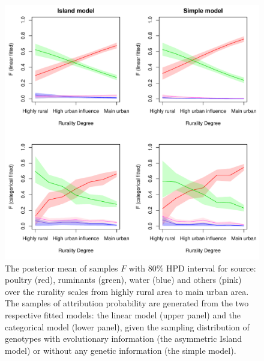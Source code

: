 \documentclass[times, doublespace]{simauth}%
\begin{document}
\begin{figure}
\centering
\includegraphics[width=.9\linewidth]{Figures/FCILandC(5)}
\caption{The posterior mean of samples $F$ with 80\% HPD interval for source: poultry (red), ruminants (green), water (blue) and others (pink) over the rurality scales from highly rural area to main urban area. The samples of attribution probability are generated from the two respective fitted models: the linear model (upper panel) and the categorical model (lower panel), given the sampling distribution of genotypes with evolutionary information (the asymmetric Island model) or without any genetic information (the simple model).}
\label{fig2}
\end{figure}
\end{document}
